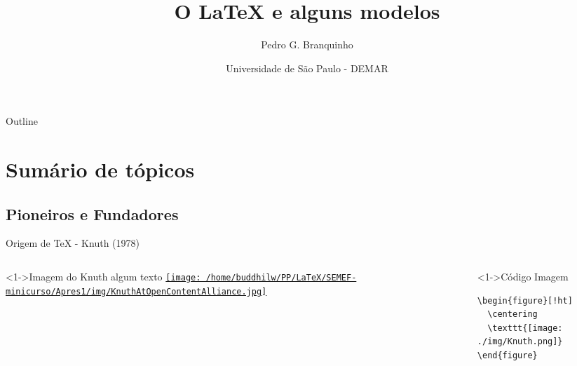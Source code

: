 \documentclass[bigger]{beamer}
\author{Pedro G. Branquinho}
\date{  Universidade de São Paulo - DEMAR}
\title{O \LaTeX{} e alguns modelos}
\begin{document}
\maketitle
\begin{frame}{Outline}
\tableofcontents
\end{frame}


\section{Sumário de tópicos}
\label{sec:org2e00d84}
\subsection{Pioneiros e Fundadores}
\label{sec:orga9093bf}
\begin{frame}[label={sec:org298d464},fragile]{Origem de \TeX{} - Knuth (1978)}
 \begin{columns}
\begin{column}{0.48\columnwidth}
\begin{block}<1->{Imagem do Knuth}
algum texto
\href{img/KnuthAtOpenContentAlliance.jpg}{\texttt{[image: /home/buddhilw/PP/LaTeX/SEMEF-minicurso/Apres1/img/KnuthAtOpenContentAlliance.jpg]}}
\end{block}
\end{column}
\begin{column}{0.48\columnwidth}
\begin{block}<1->{Código Imagem}
\begin{verbatim}
\begin{figure}[!ht]
  \centering
  \texttt{[image: ./img/Knuth.png]}
\end{figure}
\end{verbatim}
\end{block}
\end{column}
\end{columns}
\end{frame}
\end{document}
